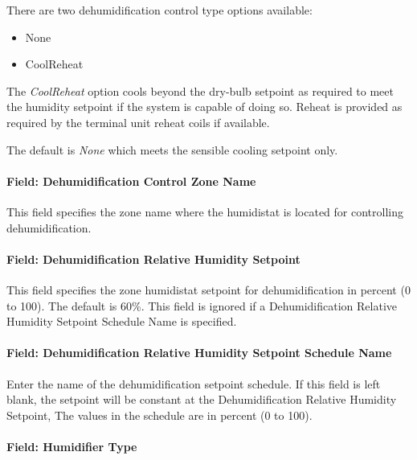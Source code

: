 There are two dehumidification control type options available:

\begin{itemize}
\item
  None
\item
  CoolReheat
\end{itemize}

The \emph{CoolReheat} option cools beyond the dry-bulb setpoint as required to meet the humidity setpoint if the system is capable of doing so. Reheat is provided as required by the terminal unit reheat coils if available.

The default is \emph{None} which meets the sensible cooling setpoint only.

\paragraph{Field: Dehumidification Control Zone Name}\label{field-dehumidification-control-zone-name-5}

This field specifies the zone name where the humidistat is located for controlling dehumidification.

\paragraph{Field: Dehumidification Relative Humidity Setpoint}\label{field-dehumidification-relative-humidity-setpoint-2}

This field specifies the zone humidistat setpoint for dehumidification in percent (0 to 100). The default is 60\%. This field is ignored if a Dehumidification Relative Humidity Setpoint Schedule Name is specified.

\paragraph{Field: Dehumidification Relative Humidity Setpoint Schedule Name}\label{field-dehumidification-relative-humidity-setpoint-schedule-name-2}

Enter the name of the dehumidification setpoint schedule. If this field is left blank, the setpoint will be constant at the Dehumidification Relative Humidity Setpoint, The values in the schedule are in percent (0 to 100).

\paragraph{Field: Humidifier Type}\label{field-humidifier-type-6}


